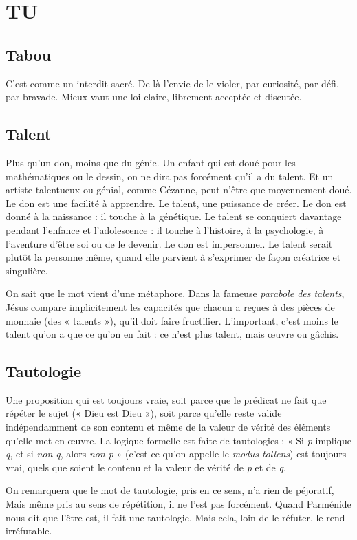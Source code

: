 \chapter{TU}

\section{Tabou}
C’est comme un interdit sacré. De là l’envie de le violer, par curiosité,
par défi, par bravade. Mieux vaut une loi claire, librement
acceptée et discutée.

\section{Talent}
Plus qu’un don, moins que du génie. Un enfant qui est doué pour
les mathématiques ou le dessin, on ne dira pas forcément qu’il a du
talent. Et un artiste talentueux ou génial, comme Cézanne, peut n'être que
moyennement doué. Le don est une facilité à apprendre. Le talent, une puissance
de créer. Le don est donné à la naissance : il touche à la génétique. Le
talent se conquiert davantage pendant l’enfance et l’adolescence : il touche à
l’histoire, à la psychologie, à l'aventure d’être soi ou de le devenir. Le don est
impersonnel. Le talent serait plutôt la personne même, quand elle parvient à
s'exprimer de façon créatrice et singulière.

On sait que le mot vient d’une métaphore. Dans la fameuse {\it parabole des
talents}, Jésus compare implicitement les capacités que chacun a reçues à des
pièces de monnaie (des « talents »), qu’il doit faire fructifier. L'important, c’est
moins le talent qu’on a que ce qu’on en fait : ce n’est plus talent, mais œuvre
ou gâchis.

\section{Tautologie}
Une proposition qui est toujours vraie, soit parce que le prédicat
ne fait que répéter le sujet (« Dieu est Dieu »), soit
parce qu’elle reste valide indépendamment de son contenu et même de la
valeur de vérité des éléments qu’elle met en œuvre. La logique formelle est faite
de tautologies : « Si {\it p} implique {\it q}, et si {\it non-q}, alors {\it non-p} » (c'est ce qu’on
appelle le {\it modus tollens}) est toujours vrai, quels que soient le contenu et la
valeur de vérité de {\it p} et de {\it q}.

On remarquera que le mot de tautologie, pris en ce sens, n’a rien de péjoratif,
Mais même pris au sens de répétition, il ne l’est pas forcément. Quand
Parménide nous dit que l’être est, il fait une tautologie. Mais cela, loin de le
réfuter, le rend irréfutable.

